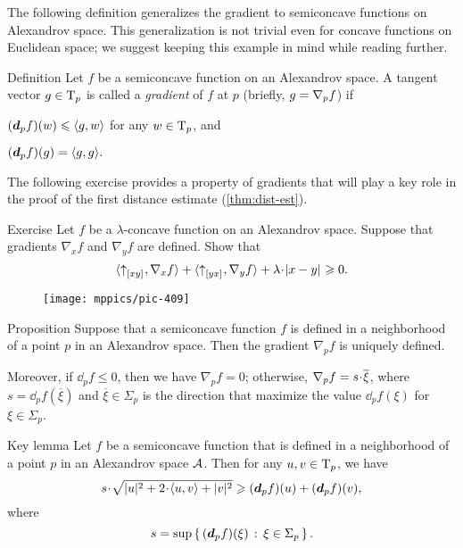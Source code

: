 The following definition generalizes the gradient to semiconcave functions on Alexandrov space.
This generalization is not trivial even for concave functions on Euclidean space;
we suggest keeping this example in mind while reading further.

\begin{thm}{Definition}\label{def:grad} 
Let $f$ be a semiconcave function on an Alexandrov space.
A tangent vector $g\in \mathrm{T}_p$ is called a 
\emph{gradient} of $f$ at $p$ 
(briefly,  $g=\nabla_p f$) if
\begin{subthm}{}
$(\bm{d}_p f)(w)\leqslant \langle g,w\rangle$ for any $w\in \mathrm{T}_p$, and
\end{subthm}

\begin{subthm}{}
$(\bm{d}_p f)(g) = \langle g,g\rangle.$
\end{subthm}
\end{thm}

The following exercise provides a property of gradients that will play a key role in the proof of the first distance estimate (\ref{thm:dist-est}).

\begin{thm}{Exercise}\label{ex:monotonicity}
Let $f$ be a $\lambda$-concave function on an Alexandrov space.
Suppose that gradients $\nabla_xf$ and $\nabla_yf$ are defined.
Show that 
\[\<\dir{x}{y},\nabla_{x}f\>
+
\<\dir{y}{x},\nabla_{y}f\>
+
\lambda\cdot\dist{x}{y}{}\ge 0.\]
\end{thm}

\begin{figure}[ht!]
\centering
\texttt{[image: mppics/pic-409]}
\end{figure}

\begin{thm}{Proposition}\label{prop:grad-exist}
Suppose that a semiconcave function $f$ is defined in a neighborhood of a point $p$ in an Alexandrov space.
Then the gradient $\nabla_pf$ is uniquely defined.

Moreover, if $\dd_pf\le 0$, then we have $\nabla_pf=0$;
otherwise, $\nabla_pf\z=s\cdot \overline{\xi}$, where 
$s= \dd_pf(\overline{\xi})$
and
$\overline{\xi}\in \Sigma_p$ is the direction that maximize the value $\dd_pf(\xi)$ for $\xi\in \Sigma_p$.
\end{thm}


\begin{thm}{Key lemma}\label{lem:ohta} 
Let $f$ be a semiconcave function that is defined in a neighborhood of a point $p$
in an Alexandrov space $\mathcal{A}$. 
Then for any $u,v\in \mathrm{T}_p$, we have
\[s\cdot \sqrt{|u|^2+2\cdot\<u,v\> +|v|^2}
\ge 
(\dd_p f)(u)+(\dd_p f)(v),\]
where
\[s=\sup\left\{\,{(\bm{d}_p f)(\xi)}\,:\,{\xi\in\Sigma_p}\,\right\}.\]

\end{thm}


